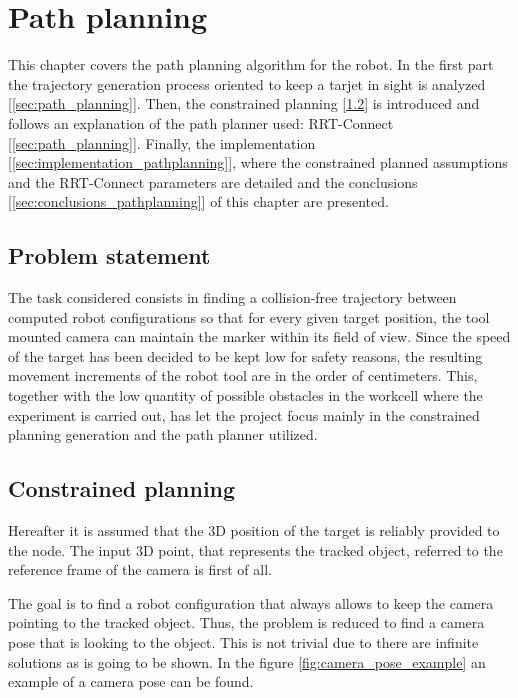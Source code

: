 \chapter{Path planning} %
\label{chap:path_planning}

This chapter covers the path planning algorithm for the robot.
In the first part the trajectory generation process oriented to keep a tarjet in sight is analyzed [\ref{sec:path_planning}]. Then, the constrained planning [\ref{sec:constrained_planning}] is introduced and follows an explanation of the path planner used: RRT-Connect [\ref{sec:path_planning}]. Finally, the implementation [\ref{sec:implementation_pathplanning}], where the constrained planned assumptions and the RRT-Connect parameters are detailed and the conclusions [\ref{sec:conclusions_pathplanning}] of this chapter are presented.
\section{Problem statement} %
\label{sec:path_planning_in_keep_object_in_sight}
The task considered consists in finding a collision-free trajectory between computed robot configurations so that for every given target position, the tool mounted camera can maintain the marker within its field of view. 
Since the speed of the target has been decided to be kept low for safety reasons, the resulting movement increments of the robot tool are in the order of centimeters. 
This, together with the low quantity of possible obstacles in the workcell where the experiment is carried out, has let the project focus mainly in the constrained planning generation and the path planner utilized.

\section{Constrained planning} %
\label{sec:constrained_planning}
Hereafter it is assumed that the 3D position of the target is reliably provided to the node.
The input 3D point, that represents the tracked object, referred to the reference frame of the camera is first of all.

The goal is to find a robot configuration that always allows to keep the camera pointing to the tracked object.
Thus, the problem is reduced to find a camera pose that is looking to the object.
This is not trivial due to there are infinite solutions as is going to be shown. In the figure \ref{fig:camera_pose_example} an example of a camera pose can be found.\\

